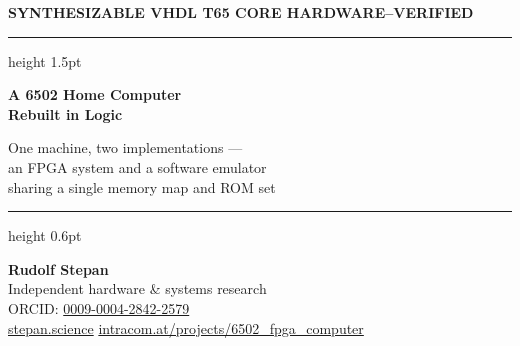 \documentclass[11pt,a4paper]{article}
\begin{document}
\begin{titlepage}
\thispagestyle{empty}
\vspace*{1.2cm}
{\sffamily\bfseries\color{soft}\large SYNTHESIZABLE VHDL \quad\textbullet\quad T65 CORE \quad\textbullet\quad HARDWARE--VERIFIED}

\vspace{0.6cm}
\hrule height 1.5pt
\vspace{0.9cm}

{\sffamily\bfseries\Huge\color{ink} A 6502 Home Computer\\[2pt] Rebuilt in Logic}

\vspace{0.5cm}
{\sffamily\Large\color{accent} One machine, two implementations ---\\ an FPGA system and a software emulator\\ sharing a single memory map and ROM set}

\vspace{1.1cm}
\hrule height 0.6pt
\vspace{0.8cm}

{\large\bfseries Rudolf Stepan}\\[2pt]
{\color{soft}Independent hardware \& systems research}\\[2pt]
{\color{soft}ORCID: \href{https://orcid.org/0009-0004-2842-2579}{0009-0004-2842-2579}}\\[2pt]
{\color{soft}\href{https://stepan.science}{stepan.science} \quad\textbullet\quad \href{https://intracom.at/projects/6502_fpga_computer/}{intracom.at/projects/6502\_fpga\_computer}}

\vspace{1.4cm}


\end{titlepage}
\end{document}
